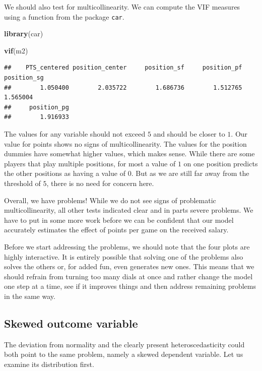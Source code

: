 \documentclass[
]{book}
\newenvironment{Shaded}{\begin{snugshade}}{\end{snugshade}}
\newcommand{\FunctionTok}[1]{\textcolor[rgb]{0.13,0.29,0.53}{\textbf{#1}}}
\newcommand{\NormalTok}[1]{#1}
\begin{document}
We should also test for multicollinearity. We can compute the VIF
measures using a function from the package \texttt{car}.

\begin{Shaded}
\begin{Highlighting}[]
\FunctionTok{library}\NormalTok{(car)}

\FunctionTok{vif}\NormalTok{(m2)}
\end{Highlighting}
\end{Shaded}

\begin{verbatim}
##    PTS_centered position_center     position_sf     position_pf     position_sg 
##        1.050400        2.035722        1.686736        1.512765        1.565004 
##     position_pg 
##        1.916933
\end{verbatim}

The values for any variable should not exceed \(5\) and should be closer
to \(1\). Our value for points shows no signs of multicollinearity. The
values for the position dummies have somewhat higher values, which makes
sense. While there are some players that play multiple positions, for
most a value of \(1\) on one position predicts the other positions as
having a value of \(0\). But as we are still far away from the threshold
of \(5\), there is no need for concern here.

Overall, we have problems! While we do not see signs of problematic
multicollinearity, all other tests indicated clear and in parts severe
problems. We have to put in some more work before we can be confident
that our model accurately estimates the effect of points per game on the
received salary.

Before we start addressing the problems, we should note that the four
plots are highly interactive. It is entirely possible that solving one
of the problems also solves the others or, for added fun, even generates
new ones. This means that we should refrain from turning too many dials
at once and rather change the model one step at a time, see if it
improves things and then address remaining problems in the same way.

\hypertarget{skewed-outcome-variable}{%
\subsection{Skewed outcome variable}\label{skewed-outcome-variable}}

The deviation from normality and the clearly present heteroscedasticity
could both point to the same problem, namely a skewed dependent
variable. Let us examine its distribution first.
\end{document}
